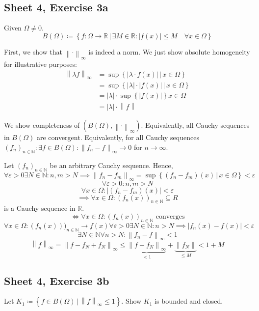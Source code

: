 \documentclass{article}
\newcommand{\set}[1]{\left\{#1\right\}}
\newcommand{\setdef}[2]{\left\{\left.#1\,\right|\,#2\right\}}
\newcommand{\norm}[1]{\left\|#1\right\|}
\newcommand{\card}[1]{\left|#1\right|}
\begin{document}
\subsection{Sheet 4, Exercise 3a}
Given $\Omega \neq 0$.
\[ B(\Omega) \coloneqq \setdef{f: \Omega \to \mathbb R}{\exists M \in \mathbb R: \card{f(x)} \leq M \quad \forall x \in \Omega} \]

First, we show that $\norm{\cdot}_{\infty}$ is indeed a norm. We just show absolute homogeneity for illustrative purposes:
\begin{align*}
  \norm{\lambda f}_{\infty}
    &= \sup\setdef{\card{\lambda \cdot f(x)}}{x \in \Omega} \\
    &= \sup\setdef{\card{\lambda} \cdot \card{f(x)}}{x \in \Omega} \\
    &= \card{\lambda} \cdot \sup\set{\card{f(x)}}{x \in \Omega} \\
    &= \card{\lambda} \cdot \norm{f}
\end{align*}

We show completeness of $(B(\Omega), \norm{\cdot}_{\infty})$.
Equivalently, all Cauchy sequences in $B(\Omega)$ are convergent.
Equivalently, for all Cauchy sequences $(f_n)_{n \in \mathbb N}: \exists f \in B(\Omega): \norm{f_n - f}_{\infty} \to 0$ for $n \to \infty$.

Let $(f_n)_{n \in \mathbb N}$ be an arbitrary Cauchy sequence. Hence,
\[ \forall \varepsilon > 0 \exists N \in \mathbb N: n,m > N \implies \norm{f_n - f_m}_{\infty} = \sup\setdef{(f_n - f_m)(x)}{x \in \Omega} < \varepsilon \]
\[ \forall \varepsilon > 0: n,m > N \]
\[ \forall x \in \Omega: \card{(f_n - f_m)(x)} < \varepsilon \]
\[ \implies \forall x \in \Omega: (f_n(x))_{n \in \mathbb N} \subseteq R \]
is a Cauchy sequence in $\mathbb R$.
\[ \iff \forall x \in \Omega: (f_n(x))_{n \in \mathbb N} \text{ converges} \]
\[ \forall x \in \Omega: (f_n(x)))_{n\in\mathbb N} \to f(x) \forall \varepsilon > 0 \exists N \in \mathbb N: n > N \implies \card{f_n(x) - f(x)} < \varepsilon \]
\[ \exists N \in \mathbb N \forall n > N: \norm{f_n - f}_{\infty} < 1 \]
\[ \norm{f}_{\infty} = \norm{f - f_N + f_N}_{\infty} \leq \underbrace{\norm{f - f_N}_{\infty}}_{<1} + \underbrace{\norm{f_N}}_{\leq M} < 1 + M \]

\subsection{Sheet 4, Exercise 3b}
Let $K_1 \coloneqq \setdef{f \in B(\Omega)}{\norm{f}_{\infty} \leq 1}$.
Show $K_1$ is bounded and closed.
\end{document}
